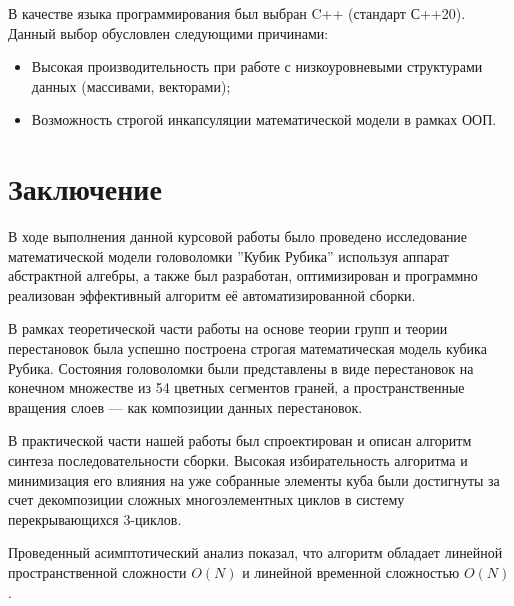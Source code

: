 \documentclass{article}
\begin{document}
В качестве языка программирования был выбран C++ (стандарт С++20). Данный выбор обусловлен следующими причинами:
\begin{itemize}
\item Высокая производительность при работе с низкоуровневыми структурами данных (массивами, векторами);
\item Возможность строгой инкапсуляции математической модели в рамках ООП.
\end{itemize}

\section{Заключение}

В ходе выполнения данной курсовой работы было проведено исследование математической модели головоломки ''Кубик Рубика'' используя аппарат абстрактной алгебры, а также был разработан, оптимизирован и программно реализован эффективный алгоритм её автоматизированной сборки.

В рамках теоретической части работы на основе теории групп и теории перестановок была успешно построена строгая математическая модель кубика Рубика. Состояния головоломки были представлены в виде перестановок на конечном множестве из 54 цветных сегментов граней, а пространственные вращения слоев — как композиции данных перестановок.

В практической части нашей работы был спроектирован и описан алгоритм синтеза последовательности сборки. Высокая избирательность алгоритма и минимизация его влияния на уже собранные элементы куба были достигнуты за счет декомпозиции сложных многоэлементных циклов в систему перекрывающихся 3-циклов.

Проведенный асимптотический анализ показал, что алгоритм обладает линейной пространственной сложности $O(N)$ и линейной временной сложностью $O(N)$.

\newpage
\end{document}
